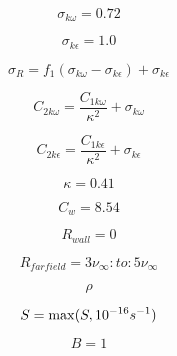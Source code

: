 \begin{equation}
\sigma_{k \omega} = 0.72
\end{equation}

\begin{equation}
\sigma_{k \epsilon} = 1.0
\end{equation}

\begin{equation}
\sigma_R = f_1(\sigma_{k \omega} - \sigma_{k \epsilon}) + \sigma_{k \epsilon}
\end{equation}

\begin{equation}
C_{2k\omega} = \frac{C_{1k\omega}}{\kappa^2} + \sigma_{k \omega}
\end{equation}

\begin{equation}
C_{2k\epsilon} = \frac{C_{1k\epsilon}}{\kappa^2} + \sigma_{k \epsilon}
\end{equation}

\begin{equation}
\kappa = 0.41
\end{equation}

\begin{equation}
C_w = 8.54
\end{equation}

\begin{equation}
R_{wall} = 0
\end{equation}

\begin{equation}
R_{farfield} = 3 \nu_{\infty} : to : 5 \nu_{\infty}
\end{equation}

\begin{equation}
\rho
\end{equation}

\begin{equation}
S = {\rm max}(S,10^{-16} s^{-1})
\end{equation}

\begin{equation}
B=1
\end{equation}


